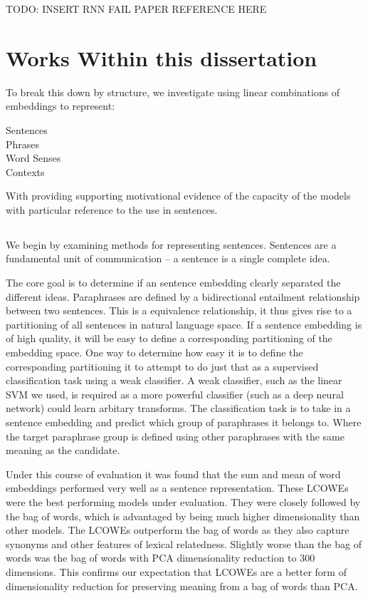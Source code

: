 \documentclass{book}
\begin{document}
TODO: INSERT RNN FAIL PAPER REFERENCE HERE




\section{Works Within this dissertation}

To break this down by structure,
we investigate using linear combinations of embeddings to represent:
\begin{description}
	\item[Sentences] 
	\item[Phrases] 
	\item[Word Senses] 
	\item[Contexts] 
\end{description}
With  providing supporting motivational evidence of the capacity of the models with particular reference to the use in sentences.


\subsection{}
We begin by examining methods for representing sentences.
Sentences are a fundamental unit of communication --
a sentence is a single complete idea.

The core goal is to determine if an sentence embedding clearly separated the different ideas.
Paraphrases are defined by a bidirectional entailment relationship between two sentences.
This is a equivalence relationship, it thus gives rise to a partitioning of all sentences in natural language space.
If a sentence embedding is of high quality, it will be easy to define a corresponding partitioning of the embedding space.
One way to determine how easy it is to define the corresponding partitioning it to attempt to do just that as a supervised classification task using a weak classifier.
A weak classifier, such as the linear SVM we used, is required as a more powerful classifier (such as a deep neural network) could learn arbitary transforms.
The classification task is to take in a sentence embedding and predict which group of paraphrases it belongs to.
Where the target paraphrase group is defined using other paraphrases with the same meaning as the candidate.

Under this course of evaluation it was found that the sum and mean of word embeddings performed very well as a sentence representation.
These LCOWEs were the best performing models under evaluation.
They were closely followed by the bag of words, which is advantaged by being much higher dimensionality than other models.
The LCOWEs outperform the bag of words as they also capture  synonyms and other features of lexical relatedness.
Slightly worse than the bag of words was the bag of words with PCA dimensionality reduction to 300 dimensions.
This confirms our expectation that LCOWEs are a better form of dimensionality reduction for preserving meaning from a bag of words than PCA.
 
\end{document}
